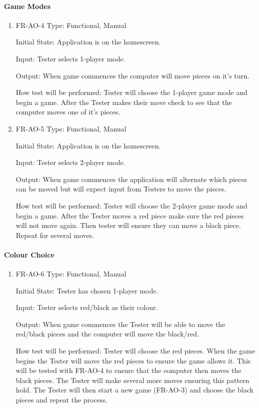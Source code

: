 \documentclass[12pt, titlepage]{article}
\begin{document}
\paragraph{Game Modes}
\begin{enumerate}
    \item{FR-AO-4}
    Type: Functional, Manual
    
    Initial State: Application is on the homescreen.
    					
    Input: Tester selects 1-player mode.
    					
    Output: When game commences the computer will move pieces on it's turn.
    					
    How test will be performed: Tester will choose the 1-player game mode and begin a game. After the Tester makes their move check to see that the computer moves one of it's pieces.
    \item{FR-AO-5}
    Type: Functional, Manual
    
    Initial State: Application is on the homescreen.
    					
    Input: Tester selects 2-player mode.
    					
    Output: When game commences the application will alternate which pieces can be moved but will expect input from Testers to move the pieces.
    					
    How test will be performed: Tester will choose the 2-player game mode and begin a game. After the Tester moves a red piece make sure the red pieces will not move again. Then tester will ensure they can move a black piece. Repeat for several moves.
\end{enumerate}

\paragraph{Colour Choice}
\begin{enumerate}
    \item{FR-AO-6}
    Type: Functional, Manual
    
    Initial State: Tester has chosen 1-player mode.
    					
    Input: Tester selects red/black as their colour.
    					
    Output: When game commences the Tester will be able to move the red/black pieces and the computer will move the black/red.
    					
    How test will be performed: Tester will choose the red pieces. When the game begins the Tester will move the red pieces to ensure the game allows it. This will be tested with FR-AO-4 to ensure that the computer then moves the black pieces. The Tester will make several more moves ensuring this pattern hold. The Tester will then start a new game (FR-AO-3) and choose the black pieces and repeat the process.
\end{enumerate}
\end{document}
